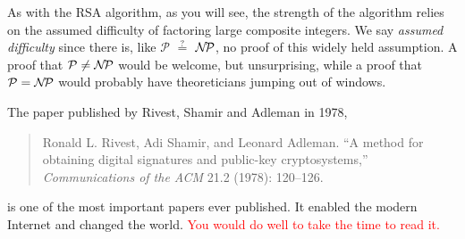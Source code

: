 \def\NNP{\mathcal{N\kern -2ptP}}

As with the RSA algorithm, as you will see, the strength of the
algorithm relies on the assumed difficulty of factoring large composite
integers. We say \emph{assumed difficulty} since there is, like
$\mathcal{P}$ {\lower 1.5pt\hbox{$\overset{?}{=}$}} $\NNP$, no proof of this widely held
assumption. A proof that $\mathcal{P} \ne \NNP$ would be
welcome, but unsurprising, while a proof that $\mathcal{P} =
\NNP$ would probably have theoreticians jumping out of windows.

The paper published by Rivest, Shamir and Adleman in 1978,
\begin{quote}
  Ronald L. Rivest, Adi Shamir, and Leonard Adleman. ``A method for
  obtaining digital signatures and public-key cryptosystems,''
  \emph{Communications of the ACM} 21.2 (1978): 120--126.
\end{quote}
is one of the most important papers ever published. It enabled the
modern Internet and changed the world. \textcolor{red}{You would do well
to take the time to read it.}
